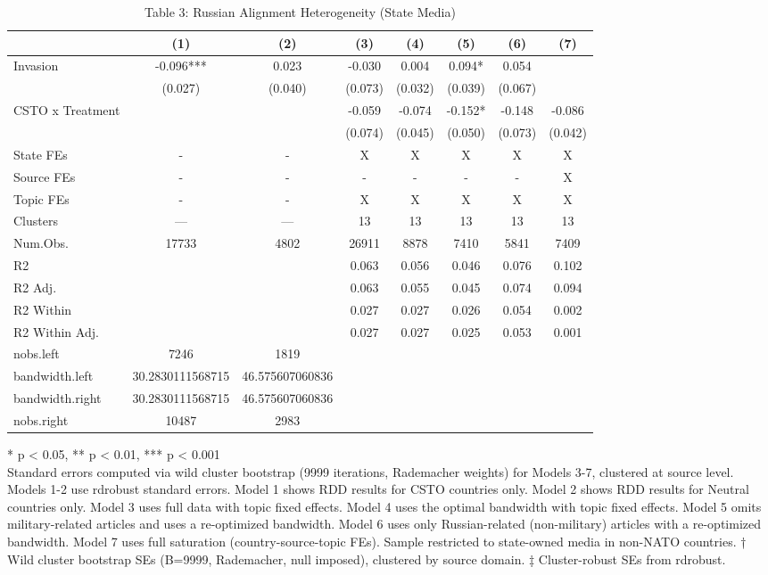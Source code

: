 \begin{table}[t]
\caption{\label{tab:table3}Table 3: Russian Alignment Heterogeneity (State Media)} 
\fontsize{12.0pt}{14.0pt}\selectfont
\begin{tabular*}{\linewidth}{@{\extracolsep{\fill}}lccccccc}
\toprule
  & (1) & (2) & (3) & (4) & (5) & (6) & (7) \\ 
\midrule\addlinespace[2.5pt]
Invasion & -0.096*** & 0.023 & -0.030 & 0.004 & 0.094* & 0.054 &  \\ 
 & (0.027) & (0.040) & (0.073) & (0.032) & (0.039) & (0.067) &  \\ 
CSTO x Treatment &  &  & -0.059 & -0.074 & -0.152* & -0.148 & -0.086 \\ 
{} & {} & {} & {(0.074)} & {(0.045)} & {(0.050)} & {(0.073)} & {(0.042)} \\ 
State FEs & - & - & X & X & X & X & X \\ 
Source FEs & - & - & - & - & - & - & X \\ 
Topic FEs & - & - & X & X & X & X & X \\ 
Clusters & — & — & 13 & 13 & 13 & 13 & 13 \\ 
Num.Obs. & 17733 & 4802 & 26911 & 8878 & 7410 & 5841 & 7409 \\ 
R2 &  &  & 0.063 & 0.056 & 0.046 & 0.076 & 0.102 \\ 
R2 Adj. &  &  & 0.063 & 0.055 & 0.045 & 0.074 & 0.094 \\ 
R2 Within &  &  & 0.027 & 0.027 & 0.026 & 0.054 & 0.002 \\ 
R2 Within Adj. &  &  & 0.027 & 0.027 & 0.025 & 0.053 & 0.001 \\ 
nobs.left & 7246 & 1819 &  &  &  &  &  \\ 
bandwidth.left & 30.2830111568715 & 46.575607060836 &  &  &  &  &  \\ 
bandwidth.right & 30.2830111568715 & 46.575607060836 &  &  &  &  &  \\ 
nobs.right & 10487 & 2983 &  &  &  &  &  \\ 
\bottomrule
\end{tabular*}
\begin{minipage}{\linewidth}
\vspace{.05em}
* p < 0.05, ** p < 0.01, *** p < 0.001\\
Standard errors computed via wild cluster bootstrap (9999 iterations, Rademacher
weights) for Models 3-7, clustered at source level. Models 1-2 use rdrobust
standard errors. Model 1 shows RDD results for CSTO countries only. Model
2 shows RDD results for Neutral countries only. Model 3 uses full data with
topic fixed effects. Model 4 uses the optimal bandwidth with topic fixed
effects. Model 5 omits military-related articles and uses a re-optimized
bandwidth. Model 6 uses only Russian-related (non-military) articles with a
re-optimized bandwidth. Model 7 uses full saturation (country-source-topic FEs).
Sample restricted to state-owned media in non-NATO countries. † Wild cluster
bootstrap SEs (B=9999, Rademacher, null imposed), clustered by source domain. ‡
Cluster-robust SEs from rdrobust.\\
\end{minipage}
\end{table}

